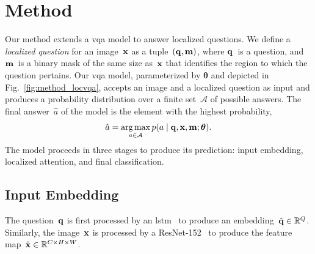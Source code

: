 \section{Method}
\label{sec:locvqa_locatt_method}

Our method extends a \gls{vqa} model to answer localized questions. We define a \emph{localized question} for an image~$\mathbf{x}$ as a tuple~$(\mathbf{q}, \mathbf{m})$, where $\mathbf{q}$~is a question, and $\mathbf{m}$~is a binary mask of the same size as~$\mathbf{x}$ that identifies the region to which the question pertains. Our \gls{vqa} model, parameterized by $\bm{\theta}$ and depicted in Fig.~\ref{fig:method_locvqa}, accepts an image and a localized question as input and produces a probability distribution over a finite set~$\mathcal{A}$ of possible answers. The final answer~$\hat{a}$ of the model is the element with the highest probability,
\begin{equation}
    \hat{a} = \operatorname*{arg\,max}_{a\in\mathcal{A}} p(a\mid \mathbf{q}, \mathbf{x}, \mathbf{m}; \bm{\theta}).
\end{equation}
The model proceeds in three stages to produce its prediction: input embedding, localized attention, and final classification.

\subsection{Input Embedding} The question~$\mathbf{q}$ is first processed by an \gls{lstm}~\cite{hochreiter1997long} to produce an embedding~$\hat{\mathbf{q}}\in\mathbb{R}^Q$. Similarly, the image~$\mathbf{x}$ is processed by a ResNet-152~\cite{he2016deep} to produce the feature map~$\hat{\mathbf{x}}\in\mathbb{R}^{C\times{}H\times{}W}$.

